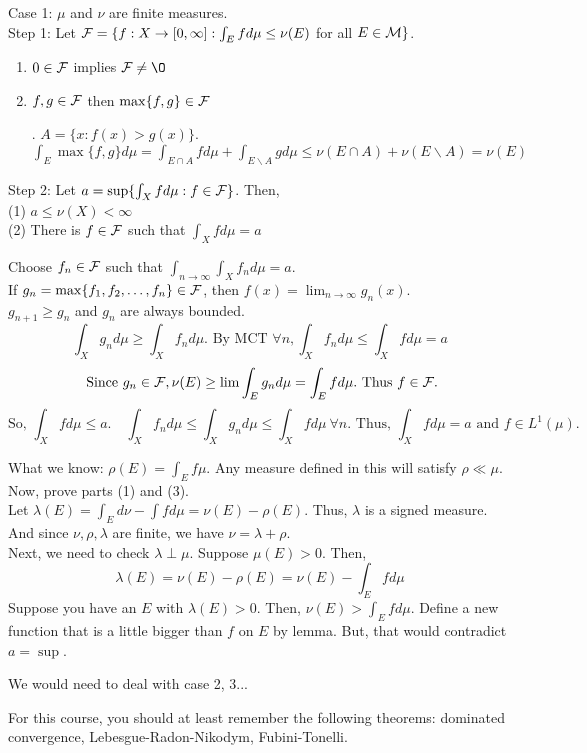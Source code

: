 \begin{pf}
	Case 1: $\mu$ and $\nu$ are finite measures. \\
	Step 1: Let ${\mathcal F} = \{ f:X \rightarrow [0, \infty] : \int_E f d \mu \leq \nu(E) $ for all $ E \in {\mathcal M} \}$.
	\begin{enumerate}
	\item $0 \in {\mathcal F}$ implies $\F \neq \O$
	\item 	$f, g \in {\mathcal F}$ then $\max \{ f,g \} \in {\mathcal F}$
	\begin{pf}. $A = \{ x: f(x) > g(x) \}$. 	$\int_E \max \{ f,g \} d \mu= \int_{E \cap A} f d \mu + \int_{E \backslash A} g d \mu \leq \nu(E \cap A) + \nu(E \backslash A) = \nu(E)$	
	\end{pf}
	\end{enumerate}
Step 2: Let $a = \sup \{ \int_X f d \mu: f \in {\mathcal F}\}$. Then, \\
(1) $a \leq \nu(X) < \infty$\\
(2) There is $f \in {\mathcal F}$ such that $\int_X f d \mu = a$ 
\begin{pf}[proof of (2)] Choose $f_n \in {\mathcal F}$ such that $\int_{n \rightarrow \infty} \int_X f_n d \mu = a$. \\
If $g_n = \max\{ f_1, f_2, \dots, f_n \} \in {\mathcal F}$, then $f(x) = \lim_{n \rightarrow \infty} g_n(x)$.\\ $g_{n + 1} \geq g_n$ and $g_n$ are always bounded.
\[
\int_X g_n d \mu \geq \int_X f_n d \mu. \text{ By MCT } \forall n, \int_X f_n d \mu \leq \int_X f d \mu  = a
\]
\[
\text{ Since } g_n \in {\mathcal F},  \nu(E) \geq \lim \int_E g_n d \mu = \int_E f d \mu . \text{ Thus } f \in {\mathcal F}.
\]
\[
\text{So, } \int_X f d \mu \leq a. \quad \int_X f_n d \mu \leq \int_X g_n d \mu \leq \int_X f d \mu \ \forall n. \text{ Thus, } \int_X f d \mu = a \text{ and } f \in L^1( \mu).
\]
\end{pf}
What we know: $\rho(E) = \int_E f \mu$. Any measure defined in this will satisfy $\rho \ll \mu$.\\
Now, prove parts (1) and (3). \\
Let $\lambda(E) = \int_E d \nu - \int f d \mu = \nu(E) - \rho(E)$. Thus, $\lambda$ is a signed measure. And since $\nu, \rho, \lambda$ are finite, we have $\nu = \lambda + \rho$. \\
Next, we need to check $\lambda \perp \mu$. Suppose $\mu(E)> 0$. Then, \[
\lambda(E) = \nu(E) - \rho(E) = \nu(E) - \int_E f d \mu
\]
Suppose you have an $E$ with $\lambda(E) > 0$. Then, $\nu(E) > \int_E f d \mu$. Define a new function that is a little bigger than $f$ on $E$ by lemma. But, that would contradict $a = \sup$. 

We would need to deal with case 2, 3...
\end{pf}
\begin{rmk}
For this course, you should at least remember the following theorems: dominated convergence, Lebesgue-Radon-Nikodym, Fubini-Tonelli.
\end{rmk}


